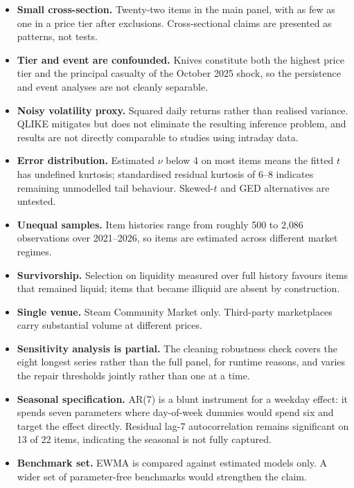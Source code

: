\documentclass[11pt,a4paper]{article}
\begin{document}
\begin{itemize}
\item \textbf{Small cross-section.} Twenty-two items in the main panel, with as
few as one in a price tier after exclusions. Cross-sectional claims are
presented as patterns, not tests.

\item \textbf{Tier and event are confounded.} Knives constitute both the
highest price tier and the principal casualty of the October 2025 shock, so the
persistence and event analyses are not cleanly separable.

\item \textbf{Noisy volatility proxy.} Squared daily returns rather than
realised variance. QLIKE mitigates but does not eliminate the resulting
inference problem, and results are not directly comparable to studies using
intraday data.

\item \textbf{Error distribution.} Estimated $\nu$ below 4 on most items means
the fitted $t$ has undefined kurtosis; standardised residual kurtosis of 6--8
indicates remaining unmodelled tail behaviour. Skewed-$t$ and GED
alternatives are untested.

\item \textbf{Unequal samples.} Item histories range from roughly 500 to 2{,}086
observations over 2021--2026, so items are estimated across different market
regimes.

\item \textbf{Survivorship.} Selection on liquidity measured over full history
favours items that remained liquid; items that became illiquid are absent by
construction.

\item \textbf{Single venue.} Steam Community Market only. Third-party
marketplaces carry substantial volume at different prices.

\item \textbf{Sensitivity analysis is partial.} The cleaning robustness check
covers the eight longest series rather than the full panel, for runtime
reasons, and varies the repair thresholds jointly rather than one at a time.

\item \textbf{Seasonal specification.} AR(7) is a blunt instrument for a
weekday effect: it spends seven parameters where day-of-week dummies would
spend six and target the effect directly. Residual lag-7 autocorrelation
remains significant on 13 of 22 items, indicating the seasonal is not fully
captured.

\item \textbf{Benchmark set.} EWMA is compared against estimated models only.
A wider set of parameter-free benchmarks would strengthen the claim.
\end{itemize}
\end{document}
